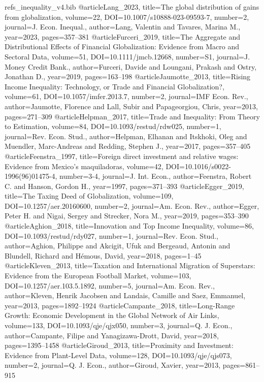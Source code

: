 \begin{filecontents*}[overwrite]{refs_inequality_v4.bib}
@article{Lang_2023, title={The global distribution of gains from globalization}, volume={22}, DOI={10.1007/s10888-023-09593-7}, number={2}, journal={J. Econ. Inequal.}, author={Lang, Valentin and Tavares, Marina M.}, year={2023}, pages={357--381} }
@article{Furceri_2019, title={The Aggregate and Distributional Effects of Financial Globalization: Evidence from Macro and Sectoral Data}, volume={51}, DOI={10.1111/jmcb.12668}, number={S1}, journal={J. Money Credit Bank.}, author={Furceri, Davide and Loungani, Prakash and Ostry, Jonathan D.}, year={2019}, pages={163--198} }
@article{Jaumotte_2013, title={Rising Income Inequality: Technology, or Trade and Financial Globalization?}, volume={61}, DOI={10.1057/imfer.2013.7}, number={2}, journal={IMF Econ. Rev.}, author={Jaumotte, Florence and Lall, Subir and Papageorgiou, Chris}, year={2013}, pages={271--309} }
@article{Helpman_2017, title={Trade and Inequality: From Theory to Estimation}, volume={84}, DOI={10.1093/restud/rdw025}, number={1}, journal={Rev. Econ. Stud.}, author={Helpman, Elhanan and Itskhoki, Oleg and Muendler, Marc-Andreas and Redding, Stephen J.}, year={2017}, pages={357--405} }
@article{Feenstra_1997, title={Foreign direct investment and relative wages: Evidence from {Mexico}'s maquiladoras}, volume={42}, DOI={10.1016/s0022-1996(96)01475-4}, number={3-4}, journal={J. Int. Econ.}, author={Feenstra, Robert C. and Hanson, Gordon H.}, year={1997}, pages={371--393} }
@article{Egger_2019, title={The Taxing Deed of Globalization}, volume={109}, DOI={10.1257/aer.20160600}, number={2}, journal={Am. Econ. Rev.}, author={Egger, Peter H. and Nigai, Sergey and Strecker, Nora M.}, year={2019}, pages={353--390} }
@article{Aghion_2018, title={Innovation and Top Income Inequality}, volume={86}, DOI={10.1093/restud/rdy027}, number={1}, journal={Rev. Econ. Stud.}, author={Aghion, Philippe and Akcigit, Ufuk and Bergeaud, Antonin and Blundell, Richard and H\'emous, David}, year={2018}, pages={1--45} }
@article{Kleven_2013, title={Taxation and International Migration of Superstars: Evidence from the {European} Football Market}, volume={103}, DOI={10.1257/aer.103.5.1892}, number={5}, journal={Am. Econ. Rev.}, author={Kleven, Henrik Jacobsen and Landais, Camille and Saez, Emmanuel}, year={2013}, pages={1892--1924} }
@article{Campante_2018, title={Long-Range Growth: Economic Development in the Global Network of Air Links}, volume={133}, DOI={10.1093/qje/qjx050}, number={3}, journal={Q. J. Econ.}, author={Campante, Filipe and Yanagizawa-Drott, David}, year={2018}, pages={1395--1458} }
@article{Giroud_2013, title={Proximity and Investment: Evidence from Plant-Level Data}, volume={128}, DOI={10.1093/qje/qjs073}, number={2}, journal={Q. J. Econ.}, author={Giroud, Xavier}, year={2013}, pages={861--915} }

\end{filecontents*}
